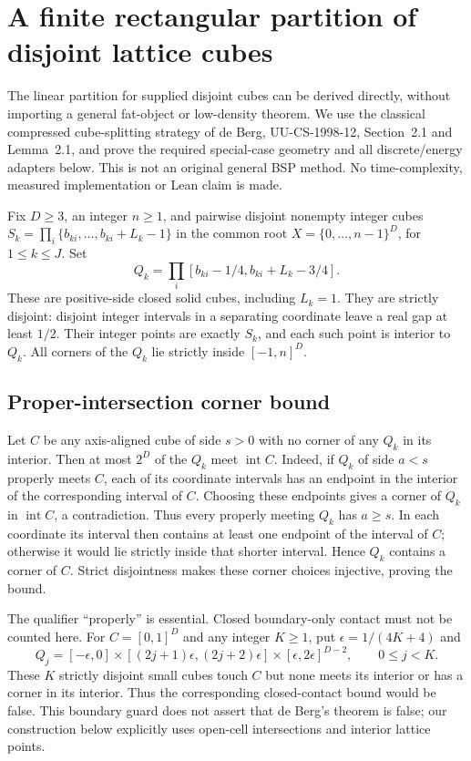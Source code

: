 \section{A finite rectangular partition of disjoint lattice cubes}
\label{sec:explicit-cube-partition}
The linear partition for supplied disjoint cubes can be derived directly,
without importing a general fat-object or low-density theorem. We use the
classical compressed cube-splitting strategy of de Berg, UU-CS-1998-12,
Section~2.1 and Lemma~2.1, and prove the required special-case geometry and
all discrete/energy adapters below. This is not an original general BSP
method. No time-complexity, measured implementation or Lean claim is made.

Fix $D\geq3$, an integer $n\geq1$, and pairwise disjoint nonempty integer
cubes $S_k=\prod_i\{b_{ki},\ldots,b_{ki}+L_k-1\}$ in the common root
$X=\{0,\ldots,n-1\}^D$, for $1\leq k\leq J$. Set
\[
 Q_k=\prod_i[b_{ki}-1/4,b_{ki}+L_k-3/4].
\]
These are positive-side closed solid cubes, including $L_k=1$. They are
strictly disjoint: disjoint integer intervals in a separating coordinate
leave a real gap at least $1/2$. Their integer points are exactly $S_k$,
and each such point is interior to $Q_k$. All corners of the $Q_k$ lie
strictly inside $[-1,n]^D$.

\subsection{Proper-intersection corner bound}
Let $C$ be any axis-aligned cube of side $s>0$ with no corner of any $Q_k$
in its interior. Then at most $2^D$ of the $Q_k$ meet $\operatorname{int}C$.
Indeed, if $Q_k$ of side $a<s$ properly meets $C$, each of its coordinate
intervals has an endpoint in the interior of the corresponding interval
of $C$. Choosing these endpoints gives a corner of $Q_k$ in
$\operatorname{int}C$, a contradiction. Thus every properly meeting $Q_k$
has $a\geq s$. In each coordinate its interval then contains at least
one endpoint of the interval of $C$; otherwise it would lie strictly
inside that shorter interval. Hence $Q_k$ contains a corner of $C$.
Strict disjointness makes these corner choices injective, proving the bound.

The qualifier ``properly'' is essential. Closed boundary-only contact
must not be counted here. For $C=[0,1]^D$ and any integer $K\geq1$, put
$\epsilon=1/(4K+4)$ and
\[
 Q_j=[-\epsilon,0]\times[(2j+1)\epsilon,(2j+2)\epsilon]
       \times[\epsilon,2\epsilon]^{D-2},\qquad0\leq j<K.
\]
These $K$ strictly disjoint small cubes touch $C$ but none meets its
interior or has a corner in its interior. Thus the corresponding
closed-contact bound would be false. This boundary guard does not assert
that de Berg's theorem is false; our construction below explicitly uses
open-cell intersections and interior lattice points.

